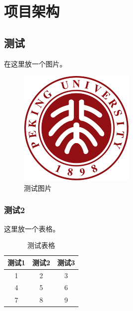 
\chapter{项目架构}

\section{测试}
在这里放一个图片。
\begin{figure}[htbp]
    \centering
    \includegraphics[width=0.5\textwidth]{pic/pkulogo.pdf}
    \caption{测试图片}
    \label{fig:1}
\end{figure}
\subsection{测试2}
这里放一个表格。
\begin{table}[htbp]
    \centering
    \caption{测试表格}
    \begin{tabular}{|c|c|c|}
        \hline
        \textbf{测试1} & \textbf{测试2} & \textbf{测试3} \\
        \hline
        1 & 2 & 3 \\
        4 & 5 & 6 \\
        7 & 8 & 9 \\
        \hline
    \end{tabular}
    \label{tab:1}
\end{table}